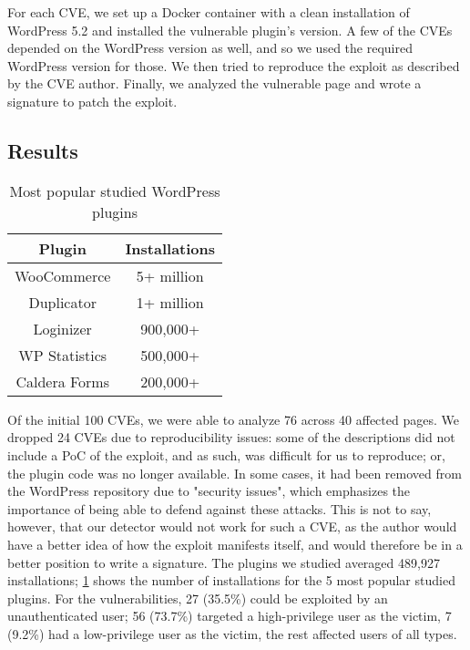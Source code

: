 For each CVE, we set up a Docker container with a clean installation of WordPress 5.2 and installed the vulnerable plugin's version. A few of the CVEs depended on the WordPress version as well, and so we used the required WordPress version for those. We then tried to reproduce the exploit as described by the CVE author. Finally, we analyzed the vulnerable page and wrote a signature to patch the exploit.

\subsection{Results}

\begin{table}[h!]
	\begin{center}
		\begin{tabular}{|c c|} 
			\hline
			Plugin & Installations\\ [1ex] 
			\hline
			WooCommerce  & 5+ million  \\  
			Duplicator & 1+ million \\  
			Loginizer & 900,000+ \\  
			WP Statistics & 500,000+ \\  
			Caldera Forms & 200,000+ \\   
			\hline
		\end{tabular}
		\caption{Most popular studied WordPress plugins}
		\label{table:1}
	\end{center}
\end{table}

Of the initial 100 CVEs, we were able to analyze 76 across 40 affected pages. We dropped 24 CVEs due to reproducibility issues: some of the descriptions did not include a PoC of the exploit, and as such, was difficult for us to reproduce; or, the plugin code was no longer available. In some cases, it had been removed from the WordPress repository due to "security issues", which emphasizes the importance of being able to defend against these attacks. This is not to say, however, that our detector would not work for such a CVE, as the author would have a better idea of how the exploit manifests itself, and would therefore be in a better position to write a signature. The plugins we studied averaged 489,927 installations; \ref{table:1} shows the number of installations for the 5 most popular studied plugins. For the vulnerabilities, 27 (35.5\%) could be exploited by an unauthenticated user; 56 (73.7\%) targeted a high-privilege user as the victim, 7 (9.2\%) had a low-privilege user as the victim, the rest affected users of all types.

